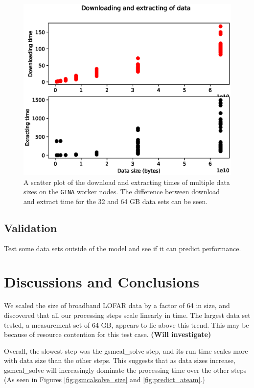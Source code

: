 \documentclass[preprint,5p]{elsarticle}
\begin{document}
\begin{figure}
    \includegraphics[width=0.95\linewidth]{figures/download_extract_sct.eps}
      \caption{A scatter plot of the download and extracting times of multiple data sizes on the \texttt{GINA} worker nodes. The difference between download and extract time for the 32 and 64 GB data sets can be seen.  }
	\label{fig:dl_plot}
\end{figure}


\subsection{Validation}
Test some data sets outside of the model and see if it can predict performance. 


\section{Discussions and Conclusions}


We scaled the size of broadband LOFAR data by a factor of 64 in size, and discovered that all our processing steps scale linearly in time. The largest data set tested, a measurement set of 64 GB, appears to lie above this trend. This may be because of resource contention for this test case. \textbf{(Will investigate)}

Overall, the slowest step was the gsmcal\_solve step, and its run time scales more  with data size than the other steps. This suggests that as data sizes increase, gsmcal\_solve will increasingly dominate the processing time over the other steps (As seen in Figures \ref{fig:gsmcalsolve_size} and \ref{fig:predict_ateam}.)
\end{document}
